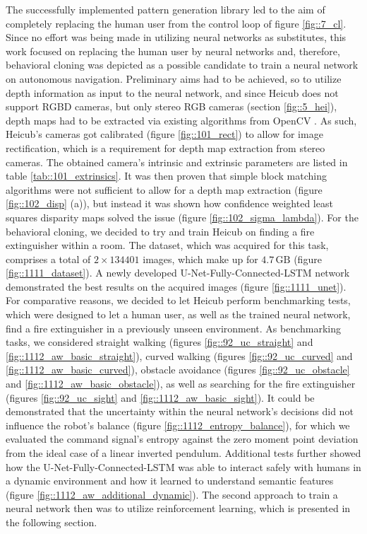 The successfully implemented pattern generation library led to the aim of completely replacing the human user from the control loop of figure \ref{fig::7_cl}. Since no effort was being made in utilizing neural networks as substitutes, this work focused on replacing the human user by neural networks and, therefore, behavioral cloning was depicted as a possible candidate to train a neural network on autonomous navigation. Preliminary aims had to be achieved, so to utilize depth information as input to the neural network, and since Heicub does not support RGBD cameras, but only stereo RGB cameras (section \ref{fig::5_hei}), depth maps had to be extracted via existing algorithms from OpenCV \cite{opencv_library}. As such, Heicub's cameras got calibrated (figure \ref{fig::101_rect}) to allow for image rectification, which is a requirement for depth map extraction from stereo cameras. The obtained camera's intrinsic and extrinsic parameters are listed in table \ref{tab::101_extrinsics}. It was then proven that simple block matching algorithms were not sufficient to allow for a depth map extraction (figure \ref{fig::102_disp} (a)), but instead it was shown how confidence weighted least squares disparity maps solved the issue (figure \ref{fig::102_sigma_lambda}). For the behavioral cloning, we decided to try and train Heicub on finding a fire extinguisher within a room. The dataset, which was acquired for this task, comprises a total of $2\times134401$ images, which make up for $4.7\,\text{GB}$ (figure \ref{fig::1111_dataset}). A newly developed U-Net-Fully-Connected-LSTM network demonstrated the best results on the acquired images (figure \ref{fig::1111_unet}). For comparative reasons, we decided to let Heicub perform benchmarking tests, which were designed to let a human user, as well as the trained neural network, find a fire extinguisher in a previously unseen environment. As benchmarking tasks, we considered straight walking (figures \ref{fig::92_uc_straight} and \ref{fig::1112_aw_basic_straight}), curved walking (figures \ref{fig::92_uc_curved} and \ref{fig::1112_aw_basic_curved}), obstacle avoidance (figures \ref{fig::92_uc_obstacle} and \ref{fig::1112_aw_basic_obstacle}), as well as searching for the fire extinguisher (figures \ref{fig::92_uc_sight} and \ref{fig::1112_aw_basic_sight}). It could be demonstrated that the uncertainty within the neural network's decisions did not influence the robot's balance (figure \ref{fig::1112_entropy_balance}), for which we evaluated the command signal's entropy against the zero moment point deviation from the ideal case of a linear inverted pendulum. Additional tests further showed how the U-Net-Fully-Connected-LSTM was able to interact safely with humans in a dynamic environment and how it learned to understand semantic features (figure \ref{fig::1112_aw_additional_dynamic}). The second approach to train a neural network then was to utilize reinforcement learning, which is presented in the following section.\\\\
